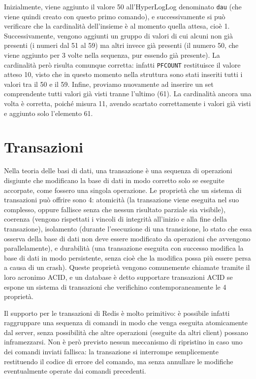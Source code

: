 Inizialmente, viene aggiunto il valore 50 all'HyperLogLog denominato \verb|dau| (che viene quindi
creato con questo primo comando), e successivamente si può verificare che la cardinalità
dell'insieme è al momento quella attesa, cioè 1. Successivamente, vengono aggiunti un gruppo di
valori di cui alcuni non già presenti (i numeri dal 51 al 59) ma altri invece già presenti (il
numero 50, che viene aggiunto per 3 volte nella sequenza, pur essendo già presente). La cardinalità
però risulta comunque corretta: infatti \verb|PFCOUNT| restituisce il valore atteso 10, visto che in
questo momento nella struttura sono stati inseriti tutti i valori tra il 50 e il 59. Infine,
proviamo nuovamente ad inserire un set comprendente tutti valori già visti tranne l'ultimo (61). La
cardinalità ancora una volta è corretta, poiché misura 11, avendo scartato correttamente i valori
già visti e aggiunto solo l'elemento 61.

\section{Transazioni}

Nella teoria delle basi di dati, una transazione è una sequenza di operazioni disgiunte che
modificano la base di dati in modo corretto solo se eseguite accorpate, come fossero una singola
operazione. Le proprietà che un sistema di transazioni può offrire sono 4: atomicità (la transazione
viene eseguita nel suo complesso, oppure fallisce senza che nessun risultato parziale sia visibile),
coerenza (vengono rispettati i vincoli di integrità all'inizio e alla fine della transazione),
isolamento (durante l'esecuzione di una transizione, lo stato che essa osserva della base di dati
non deve essere modificato da operazioni che avvengono parallelamente), e durabilità (una
transazione eseguita con successo modifica la base di dati in modo persistente, senza cioè che la
modifica possa più essere persa a causa di un crash). Queste proprietà vengono comunemente chiamate
tramite il loro acronimo ACID, e un database è detto supportare transazioni ACID se espone un
sistema di transazioni che verifichino contemporaneamente le 4 proprietà.

Il supporto per le transazioni di Redis è molto primitivo: è possibile infatti raggruppare
una sequenza di comandi in modo che venga eseguita atomicamente dal server, senza possibilità che
altre operazioni (eseguite da altri client) possano inframezzarsi. Non è però previsto nessun
meccanismo di ripristino in caso uno dei comandi inviati fallisca: la transazione si interrompe
semplicemente restituendo il codice di errore del comando, ma senza annullare le modifiche
eventualmente operate dai comandi precedenti.

